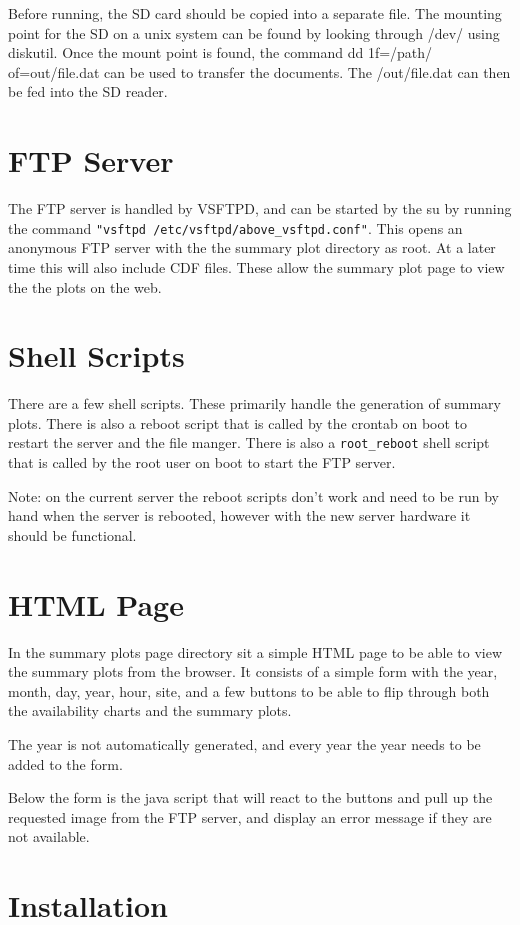 \documentclass{article}
\begin{document}
Before running, the SD card should be copied into a separate file. The mounting point for the SD on a unix system can be found by looking through /dev/ using diskutil. Once the mount point is found, the command dd 1f=/path/ of=out/file.dat can be used to transfer the documents. The /out/file.dat can then be fed into the SD reader. 

\section{FTP Server}
The FTP server is handled by VSFTPD, and can be started by the su by running the command \texttt{"vsftpd /etc/vsftpd/above\_vsftpd.conf"}. This opens an anonymous FTP server with the the summary plot directory as root. At a later time this will also include CDF files. These allow the summary plot page to view the the plots on the web.


\section{Shell Scripts}

There are a few shell scripts. These primarily handle the generation of summary plots. There is also a reboot script that is called by the crontab on boot to restart the server and the file manger. There is also a \texttt{root\_reboot} shell script that is called by the root user on boot to start the FTP server. 

Note: on the current server the reboot scripts don't work and need to be run by hand when the server is rebooted, however with the new server hardware it should be functional.

\section{HTML Page}
In the summary plots page directory sit a simple HTML page to be able to view the summary plots from the browser. It consists of a simple form with the year, month, day, year, hour, site, and a few buttons to be able to flip through both the availability charts and the summary plots.

The year is not automatically generated, and every year the year needs to be added to the form. 

Below the form is the java script that will react to the buttons and pull up the requested image from the FTP server, and display an error message if they are not available.


\section{Installation}
\end{document}
